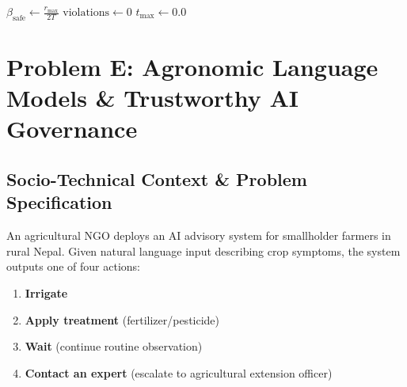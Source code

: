 \documentclass[11pt,a4paper]{article}
\theoremstyle{definition}
\theoremstyle{plain}
\theoremstyle{remark}
\begin{document}
\begin{algorithm}[htbp]
\SetAlgoLined
{}
$\beta_{\text{safe}} \leftarrow \frac{r_{\max}}{2T}$\;
$\text{violations} \leftarrow 0$\;
$\hat{t}_{\max} \leftarrow 0.0$\;
\;
\caption{Monte Carlo Stochastic Verification of RLHF Safety Boundary}
\label{alg:drift_monte_carlo}
\end{algorithm}

\section{Problem E: Agronomic Language Models \& Trustworthy AI Governance}

\subsection{Socio-Technical Context \& Problem Specification}
An agricultural NGO deploys an AI advisory system for smallholder farmers in rural Nepal. Given natural language input describing crop symptoms, the system outputs one of four actions:
\begin{enumerate}[noitemsep]
    \item \textbf{Irrigate}
    \item \textbf{Apply treatment} (fertilizer/pesticide)
    \item \textbf{Wait} (continue routine observation)
    \item \textbf{Contact an expert} (escalate to agricultural extension officer)
\end{enumerate}
\end{document}
